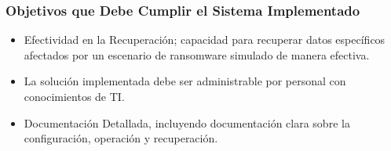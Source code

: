 \subsubsection{Objetivos que Debe Cumplir el Sistema Implementado}
\begin{itemize}
  \item Efectividad en la Recuperación; capacidad para recuperar datos específicos afectados por un escenario de ransomware simulado de manera efectiva.
  \item La solución implementada debe ser administrable por personal con conocimientos de TI.
  \item Documentación Detallada, incluyendo documentación clara sobre la configuración, operación y recuperación.
\end{itemize}

